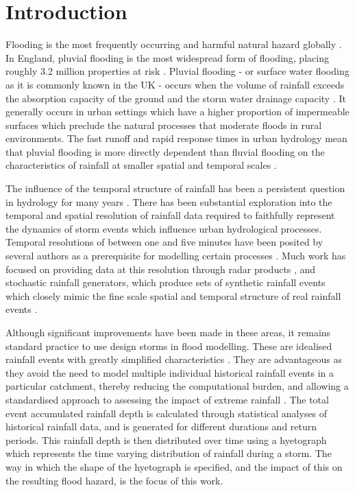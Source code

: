 \documentclass[APA,Times2COL]{WileyNJDv5}
\begin{document}
\section{Introduction}\label{sec:introduction}

Flooding is the most frequently occurring and harmful natural hazard globally \citep{jenkins2018probabilistic, razavi2020anthropocene}. In England, pluvial flooding is the most widespread form of flooding, placing roughly 3.2 million properties at risk \citep{envagency2021}. Pluvial flooding - or surface water flooding as it is commonly known in the UK - occurs when the volume of rainfall exceeds the absorption capacity of the ground and the storm water drainage capacity \citep{archer_characterising_2015}. It generally occurs in urban settings which have a higher proportion of impermeable surfaces which preclude the natural processes that moderate floods in rural environments. The fast runoff and rapid response times in urban hydrology mean that pluvial flooding is more directly dependent than fluvial flooding on the characteristics of rainfall at smaller spatial and temporal scales \citep{ochoa2015impact, peleg2016partitioning}.

The influence of the temporal structure of rainfall has been a persistent question in hydrology for many years \citep{dawdy1969effect, singh1997effect, woods1999synthesis}. There has been substantial exploration into the temporal and spatial resolution of rainfall data required to faithfully represent the dynamics of storm events which influence urban hydrological processes. Temporal resolutions of between one and five minutes have been posited by several authors as a prerequisite for modelling certain processes \citep{schilling1991rainfall, einfalt2004towards, berne2013radar}. Much work has focused on providing data at this resolution through radar products \citep{einfalt2004towards, thorndahl2017weather, bruni2015sensitivity}, and stochastic rainfall generators, which produce sets of synthetic rainfall events which closely mimic the fine scale spatial and temporal structure of real rainfall events \citep{peleg2016partitioning, zhu2018impact, paschalis2014effects, gabellani2007propagation}. 

Although significant improvements have been made in these areas, it remains standard practice to use design storms in flood modelling. These are idealised rainfall events with greatly simplified characteristics \citep{butler_urban_2004}. They are advantageous as they avoid the need to model multiple individual historical rainfall events in a particular catchment, thereby reducing the computational burden, and allowing a standardised approach to assessing the impact of extreme rainfall \citep{marsalek1984design, balbastre2019comparison}. The total event accumulated rainfall depth is calculated through statistical analyses of historical rainfall data, and is generated for different durations and return periods. This rainfall depth is then distributed over time using a hyetograph which represents the time varying distribution of rainfall during a storm. The way in which the shape of the hyetograph is specified, and the impact of this on the resulting flood hazard, is the focus of this work.
\end{document}
